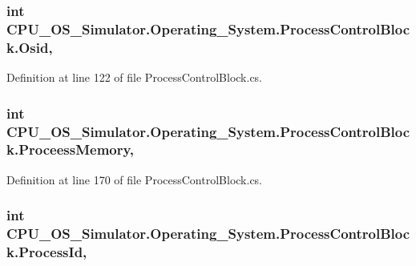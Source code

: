 \subsubsection[{Osid}]{\setlength{\rightskip}{0pt plus 5cm}int C\+P\+U\+\_\+\+O\+S\+\_\+\+Simulator.\+Operating\+\_\+\+System.\+Process\+Control\+Block.\+Osid\hspace{0.3cm}{\ttfamily [get]}, {\ttfamily [set]}}\label{class_c_p_u___o_s___simulator_1_1_operating___system_1_1_process_control_block_a4543f27a0bafc028e2a76e7ff301d48f}


Definition at line 122 of file Process\+Control\+Block.\+cs.

\hypertarget{class_c_p_u___o_s___simulator_1_1_operating___system_1_1_process_control_block_a7a73f2ca49a669fc3d2693ee6d0b8aff}{}
\subsubsection[{Proceess\+Memory}]{\setlength{\rightskip}{0pt plus 5cm}int C\+P\+U\+\_\+\+O\+S\+\_\+\+Simulator.\+Operating\+\_\+\+System.\+Process\+Control\+Block.\+Proceess\+Memory\hspace{0.3cm}{\ttfamily [get]}, {\ttfamily [set]}}\label{class_c_p_u___o_s___simulator_1_1_operating___system_1_1_process_control_block_a7a73f2ca49a669fc3d2693ee6d0b8aff}


Definition at line 170 of file Process\+Control\+Block.\+cs.

\hypertarget{class_c_p_u___o_s___simulator_1_1_operating___system_1_1_process_control_block_a65da99ff450282dcbc4d43288237f0e9}{}
\subsubsection[{Process\+Id}]{\setlength{\rightskip}{0pt plus 5cm}int C\+P\+U\+\_\+\+O\+S\+\_\+\+Simulator.\+Operating\+\_\+\+System.\+Process\+Control\+Block.\+Process\+Id\hspace{0.3cm}{\ttfamily [get]}, {\ttfamily [set]}}\label{class_c_p_u___o_s___simulator_1_1_operating___system_1_1_process_control_block_a65da99ff450282dcbc4d43288237f0e9}



